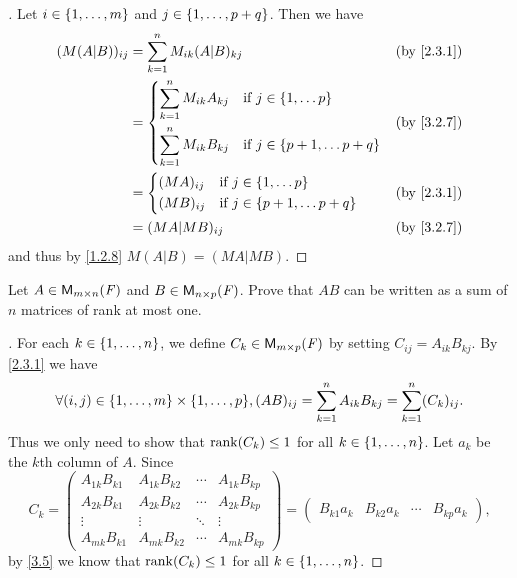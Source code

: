 \begin{proof}[]
	Let \(i \in \left\lbrace1, \dots, m\right\rbrace\) and \(j \in \left\lbrace1, \dots, p + q\right\rbrace\).
	Then we have
	\begin{align*}
		(M (A | B))_{i j} & = \sum_{k = 1}^n M_{i k} (A | B)_{k j}                                        &  & \by{2.3.1} \\
		                  & = \begin{dcases}
			                      \sum_{k = 1}^n M_{i k} A_{k j} & \text{if } j \in \set{1, \dots p}         \\
			                      \sum_{k = 1}^n M_{i k} B_{k j} & \text{if } j \in \set{p + 1, \dots p + q}
		                      \end{dcases} &  & \by{3.2.7}                  \\
		                  & = \begin{dcases}
			                      (MA)_{i j} & \text{if } j \in \set{1, \dots p}         \\
			                      (MB)_{i j} & \text{if } j \in \set{p + 1, \dots p + q}
		                      \end{dcases}                     &  & \by{2.3.1}                                      \\
		                  & = (MA | MB)_{i j}                                                             &  & \by{3.2.7}
	\end{align*}
	and thus by \cref{1.2.8} \(M (A | B) = (MA | MB)\).
\end{proof}

\setcounter{ex}{17}
\begin{ex}\label{ex:3.2.18}
	Let \(A \in \MS\) and \(B \in \ms[n][p][\F]\).
	Prove that \(AB\) can be written as a sum of \(n\) matrices of rank at most one.
\end{ex}

\begin{proof}[]
	For each \(k \in \left\lbrace1, \dots, n\right\rbrace\), we define \(C_k \in \ms[m][p][\F]\) by setting \(C_{i j} = A_{i k} B_{k j}\).
	By \cref{2.3.1} we have
	\[
		\forall (i, j) \in \set{1, \dots, m} \times \set{1, \dots, p}, (AB)_{i j} = \sum_{k = 1}^n A_{i k} B_{k j} = \sum_{k = 1}^n (C_k)_{i j}.
	\]
	Thus we only need to show that \(\rk{C_k} \leq 1\) for all \(k \in \left\lbrace1, \dots, n\right\rbrace\).
	Let \(a_k\) be the \(k\)th column of \(A\).
	Since
	\[
		C_k = \begin{pmatrix}
			A_{1 k} B_{k 1} & A_{1 k} B_{k 2} & \cdots & A_{1 k} B_{k p} \\
			A_{2 k} B_{k 1} & A_{2 k} B_{k 2} & \cdots & A_{2 k} B_{k p} \\
			\vdots          & \vdots          & \ddots & \vdots          \\
			A_{m k} B_{k 1} & A_{m k} B_{k 2} & \cdots & A_{m k} B_{k p}
		\end{pmatrix} = \begin{pmatrix}
			B_{k 1} a_k & B_{k 2} a_k & \cdots & B_{k p} a_k
		\end{pmatrix},
	\]
	by \cref{3.5} we know that \(\rk{C_k} \leq 1\) for all \(k \in \left\lbrace1, \dots, n\right\rbrace\).
\end{proof}

